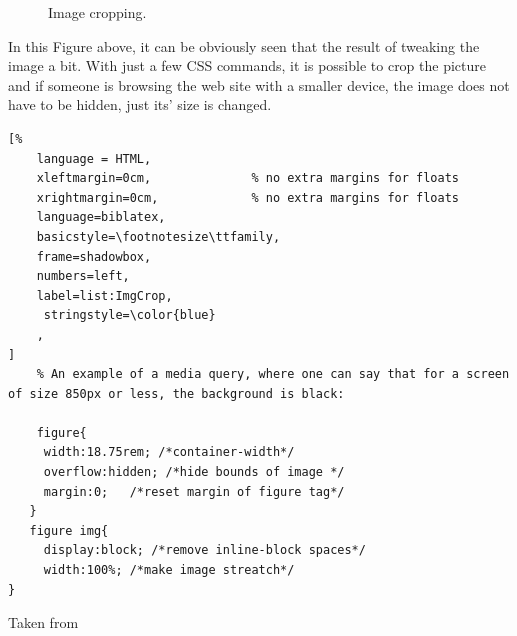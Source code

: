 \begin{figure}[tp]
    \centering
    \hfill

    \caption[Image Cropping]
    {
        Image cropping.
    }
    \label{img_cropping}
\end{figure}

In this Figure above, it can be obviously seen that the result of tweaking the image a bit.
With just a few CSS commands, it is possible to crop the picture and if someone is browsing the
web site with a smaller device, the image does not have to be hidden, just its' size is changed.

\begin{lstlisting}[%
    language = HTML, 
    xleftmargin=0cm,              % no extra margins for floats
    xrightmargin=0cm,             % no extra margins for floats
    language=biblatex,
    basicstyle=\footnotesize\ttfamily,
    frame=shadowbox,
    numbers=left,
    label=list:ImgCrop,
     stringstyle=\color{blue}
    ,
]
    % An example of a media query, where one can say that for a screen of size 850px or less, the background is black:

    figure{
     width:18.75rem; /*container-width*/
     overflow:hidden; /*hide bounds of image */
     margin:0;   /*reset margin of figure tag*/
   }
   figure img{
     display:block; /*remove inline-block spaces*/
     width:100%; /*make image streatch*/
}
\end{lstlisting}
Taken from
